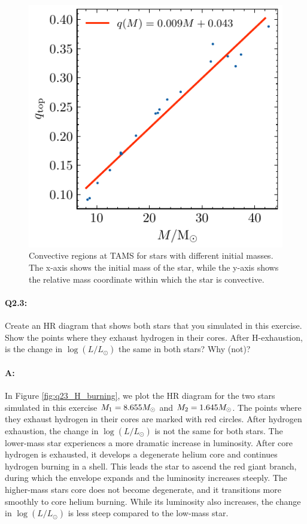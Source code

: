 \documentclass[twocolumn,fontsize=11pt]{scrartcl}
\begin{document}
\begin{figure}[htbp]
    \centering
    \includegraphics{q22_top_fit.pdf}
    \caption{Convective regions at TAMS for stars with different initial masses. The x-axis shows the initial mass of the star, while the y-axis shows the relative mass coordinate within which the star is convective.}
    \label{fig:q22_convective_regions}
\end{figure}

\paragraph{Q2.3:} Create an HR diagram that shows both stars that you simulated in this exercise. Show the points where they exhaust hydrogen in their cores. After H-exhaustion, is the change in \(\log(L/L_\odot)\) the same in both stars? Why (not)? 

\paragraph{A:} In Figure \ref{fig:q23_H_burning}, we plot the HR diagram for the two stars simulated in this exercise \(M_1 = 8.655M_\odot\) and \(M_2 = 1.645M_\odot\). The points where they exhaust hydrogen in their cores are marked with red circles. After hydrogen exhaustion, the change in \(\log(L/L_\odot)\) is not the same for both stars. The lower-mass star experiences a more dramatic increase in luminosity. After core hydrogen is exhausted, it develops a degenerate helium core and continues hydrogen burning in a shell. This leads the star to ascend the red giant branch, during which the envelope expands and the luminosity increases steeply. The higher-mass stars core does not become degenerate, and it transitions more smoothly to core helium burning. While its luminosity also increases, the change in \(\log(L/L_\odot)\) is less steep compared to the low-mass star.
\end{document}
